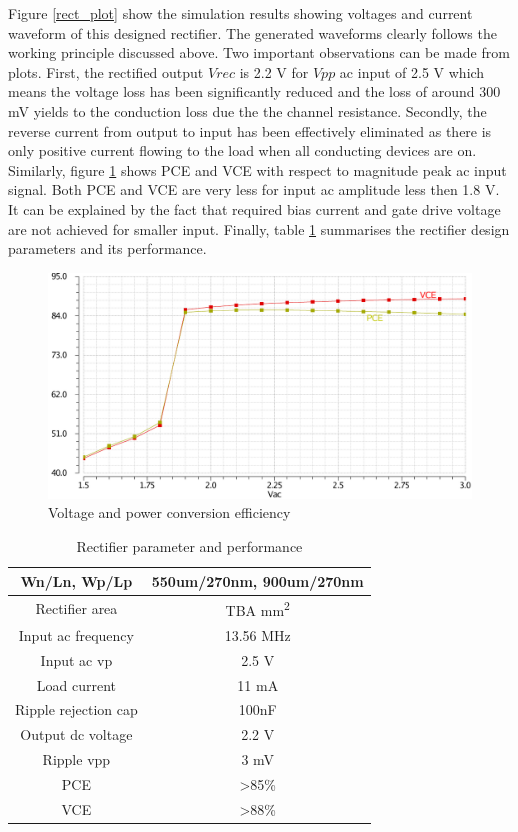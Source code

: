 \documentclass[12pt,a4paper,UKenglish]{article}
\begin{document}
Figure \ref{rect_plot} show the simulation results showing voltages and current waveform of this designed rectifier. The generated waveforms clearly follows the working principle discussed above. Two important observations can be made from plots. First, the rectified output $Vrec$ is 2.2 V for $Vpp$ ac input of 2.5 V which means the voltage loss has been significantly reduced and the loss of around 300 mV yields to the conduction loss due the the channel resistance. Secondly, the reverse current from output to input has been effectively eliminated as there is only positive current flowing to the load when all conducting devices are on.  Similarly, figure  \ref{rect_ce} shows PCE and VCE with respect to magnitude peak ac input signal. Both PCE and VCE are very less for input ac amplitude less then 1.8 V. It can be explained by the fact that required bias current and gate drive voltage are not achieved for smaller input. Finally, table \ref{rect_spec} summarises the rectifier design parameters and its performance.

\begin{figure}[htbp] %
   \centering
   \includegraphics[width=.8\textwidth]{img/rect_ce.pdf} 
   \caption{Voltage and power conversion efficiency}
   \label{rect_ce}
\end{figure}

\begin{table}[htbp]
\caption{Rectifier parameter and performance}
\begin{center}
\begin{tabular}{c|c}
\hline \hline
Wn/Ln, Wp/Lp & 550um/270nm, 900um/270nm \\ \hline
Rectifier area & TBA mm\textsuperscript{2} \\ \hline
Input ac frequency & 13.56 MHz \\ \hline
Input ac \acrshort{vp} & 2.5 V \\ \hline
Load current & 11 mA \\ \hline
Ripple rejection cap & 100nF \\ \hline
Output dc voltage & 2.2 V \\ \hline
Ripple \acrshort{vpp} & 3 mV \\ \hline
PCE & >85\% \\ \hline
VCE & >88\% \\
\hline \hline
\end{tabular}
\end{center}
\label{rect_spec}
\end{table}
\end{document}
